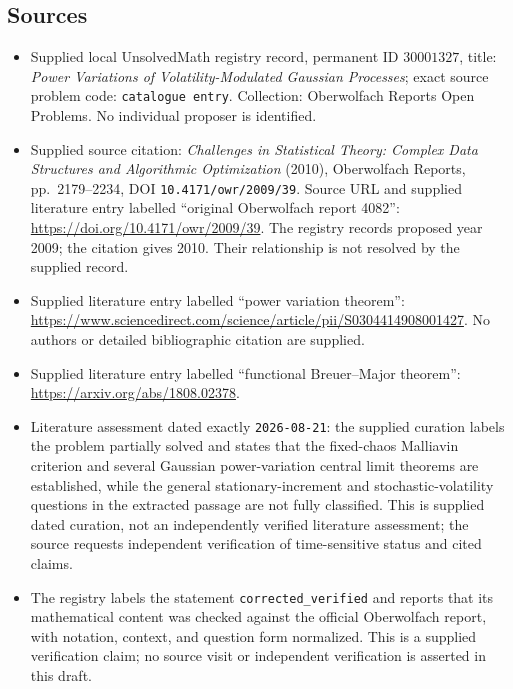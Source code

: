 \documentclass[11pt]{article}
\begin{document}
\subsection{Sources}
\begin{itemize}
\item Supplied local UnsolvedMath registry record, permanent ID \(30001327\), title: \emph{Power Variations of Volatility-Modulated Gaussian Processes}; exact source problem code: \texttt{catalogue entry}. Collection: Oberwolfach Reports Open Problems. No individual proposer is identified.
\item Supplied source citation: \emph{Challenges in Statistical Theory: Complex Data Structures and Algorithmic Optimization} (2010), Oberwolfach Reports, pp.\ 2179--2234, DOI \texttt{10.4171/owr/2009/39}. Source URL and supplied literature entry labelled ``original Oberwolfach report 4082'': \url{https://doi.org/10.4171/owr/2009/39}. The registry records proposed year 2009; the citation gives 2010. Their relationship is not resolved by the supplied record.
\item Supplied literature entry labelled ``power variation theorem'': \url{https://www.sciencedirect.com/science/article/pii/S0304414908001427}. No authors or detailed bibliographic citation are supplied.
\item Supplied literature entry labelled ``functional Breuer--Major theorem'': \url{https://arxiv.org/abs/1808.02378}.
\item Literature assessment dated exactly \texttt{2026-08-21}: the supplied curation labels the problem partially solved and states that the fixed-chaos Malliavin criterion and several Gaussian power-variation central limit theorems are established, while the general stationary-increment and stochastic-volatility questions in the extracted passage are not fully classified. This is supplied dated curation, not an independently verified literature assessment; the source requests independent verification of time-sensitive status and cited claims.
\item The registry labels the statement \texttt{corrected\_verified} and reports that its mathematical content was checked against the official Oberwolfach report, with notation, context, and question form normalized. This is a supplied verification claim; no source visit or independent verification is asserted in this draft.
\end{itemize}
\end{document}
